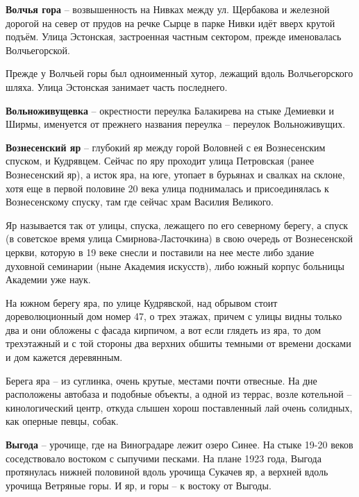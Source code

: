 \medskip

\textbf{Волчья гора} – возвышенность на Нивках между ул. Щербакова и железной дорогой на север от прудов на речке Сырце в парке Нивки идёт вверх крутой подъём. Улица Эстонская, застроенная частным сектором, прежде именовалась Волчьегорской.

Прежде у Волчьей горы был одноименный хутор, лежащий вдоль Волчьегорского шляха. Улица Эстонская занимает часть последнего.\\

\medskip

\textbf{Вольноживущевка} – окрестности переулка Балакирева на стыке Демиевки и Ширмы, именуется от прежнего названия переулка – переулок Вольноживущих.\\

\medskip

\textbf{Вознесенский яр} – глубокий яр между горой Воловней с ея Вознесенским спуском, и Кудрявцем. Сейчас по яру проходит улица Петровская (ранее Вознесенский яр), а исток яра, на юге, утопает в бурьянах и свалках на склоне, хотя еще в первой половине 20 века улица поднималась и присоединялась к Вознесенскому спуску, там где сейчас храм Василия Великого. 

Яр называется так от улицы, спуска, лежащего по его северному берегу, а спуск (в советское время улица Смирнова-Ласточкина) в свою очередь от Вознесенской церкви, которую в 19 веке снесли и поставили на нее месте либо здание духовной семинарии (ныне Академия искусств), либо южный корпус больницы Академии уже наук.

На южном берегу яра, по улице Кудрявской, над обрывом стоит дореволюционный дом номер 47, о трех этажах, причем с улицы видны только два и они обложены с фасада кирпичом, а вот если глядеть из яра, то дом трехэтажный и с той стороны два верхних обшиты темными от времени досками и дом кажется деревянным.

Берега яра – из суглинка, очень крутые, местами почти отвесные. На дне расположены автобаза и подобные объекты, а одной из террас, возле котельной – кинологический центр, откуда слышен хорош поставленный лай очень солидных, как оперные певцы, собак.\\

\medskip

\textbf{Выгода} – урочище, где на Виноградаре лежит озеро Синее. На стыке 19-20 веков соседствовало востоком с сыпучими песками. На плане 1923 года, Выгода протянулась нижней половиной вдоль урочища Сукачев яр, а верхней вдоль урочища Ветряные горы. И яр, и горы – к востоку от Выгоды.\\ 

